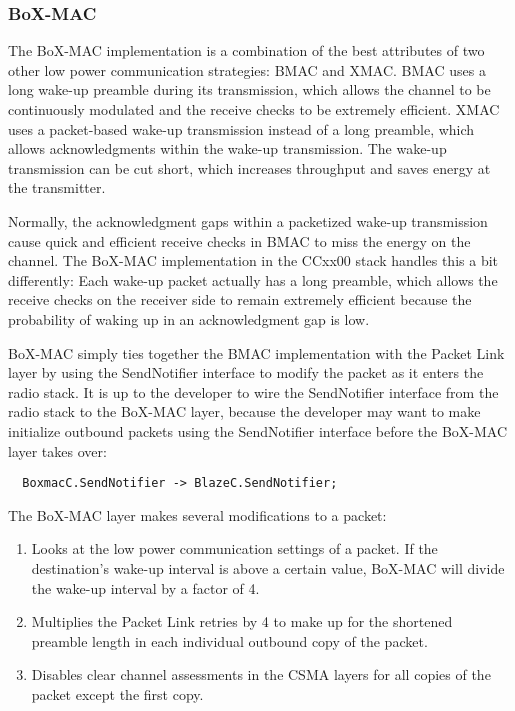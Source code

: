 \documentclass{article}
\begin{document}
\subsubsection{BoX-MAC}
\label{sec:boxmac}
The BoX-MAC \cite{boxmac} implementation is a combination of the best attributes of two other
low power communication strategies:  BMAC and XMAC.  BMAC uses a long wake-up 
preamble during its transmission, which allows the channel to be continuously 
modulated and the receive checks to be extremely efficient.  XMAC uses a packet-based
wake-up transmission instead of a long preamble, which allows acknowledgments within
the wake-up transmission. The wake-up transmission can be cut short, which increases 
throughput and saves energy at the transmitter. 

Normally, the acknowledgment gaps within a packetized wake-up transmission cause 
quick and efficient receive checks in BMAC to miss the energy on the channel. The
BoX-MAC implementation in the CCxx00 stack handles this a bit differently: Each
wake-up packet actually has a long preamble, which allows the receive checks on the
receiver side to remain extremely efficient because the probability of waking up 
in an acknowledgment gap is low.

BoX-MAC simply ties together the BMAC implementation with the Packet Link layer
by using the SendNotifier interface to modify the packet as it enters the radio
stack. It is up to the developer to wire the SendNotifier interface from the radio stack
to the BoX-MAC layer, because the developer may want to make initialize outbound packets using the
SendNotifier interface before the BoX-MAC layer takes over:

\begin{verbatim}
  BoxmacC.SendNotifier -> BlazeC.SendNotifier;
\end{verbatim}

The BoX-MAC layer makes several modifications to a packet:

\begin{enumerate}
  \item Looks at the low power communication settings of a packet. If the destination's
  wake-up interval is above a certain value, BoX-MAC will divide the wake-up interval
  by a factor of 4.
  \item Multiplies the Packet Link retries by 4 to make up for the shortened preamble
  length in each individual outbound copy of the packet.
  \item Disables clear channel assessments in the CSMA layers for all copies of the
  packet except the first copy.
\end{enumerate} 
\end{document}
